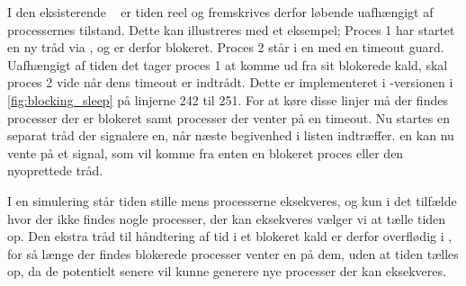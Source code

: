 I den eksisterende \sched ~ er tiden reel og fremskrives derfor løbende uafhængigt af processernes tilstand. Dette kan illustreres med et eksempel; Proces 1 har startet en ny tråd via , og er derfor blokeret. Proces 2 står i en  med en timeout guard. Uafhængigt af tiden det tager proces 1 at komme ud fra sit blokerede kald, skal proces 2 vide når dens timeout er indtrådt. Dette er implementeret i -versionen i \cref{fig:blocking_sleep} på linjerne 242 til 251. For at køre disse linjer må  der findes processer der er blokeret samt processer der venter på en timeout. Nu startes en separat tråd der signalere \sched en, når næste begivenhed i  listen indtræffer. \Sched en kan nu vente på et signal, som vil komme fra enten en blokeret proces eller den nyoprettede tråd.

I en simulering står tiden stille mens processerne  eksekveres, og kun i det tilfælde hvor der ikke findes nogle processer, der kan eksekveres vælger vi at tælle tiden op.  Den ekstra tråd til håndtering af tid i et blokeret kald er derfor overflødig i \des, for så længe der findes blokerede processer venter \sched en på dem, uden at tiden tælles op, da de potentielt senere vil kunne  generere nye processer der kan eksekveres.

